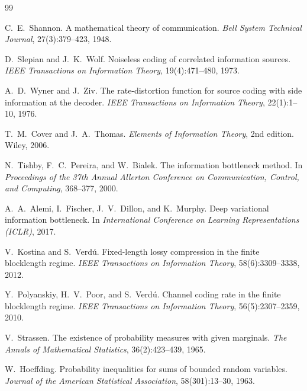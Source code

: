 \documentclass[11pt,a4paper]{article}
\theoremstyle{remark}
\begin{document}
\begin{thebibliography}{99}

C.~E.~Shannon.
\newblock A mathematical theory of communication.
\newblock \emph{Bell System Technical Journal}, 27(3):379--423, 1948.

D.~Slepian and J.~K.~Wolf.
\newblock Noiseless coding of correlated information sources.
\newblock \emph{IEEE Transactions on Information Theory}, 19(4):471--480, 1973.

A.~D.~Wyner and J.~Ziv.
\newblock The rate-distortion function for source coding with side information at the decoder.
\newblock \emph{IEEE Transactions on Information Theory}, 22(1):1--10, 1976.

T.~M.~Cover and J.~A.~Thomas.
\newblock \emph{Elements of Information Theory}, 2nd edition.
\newblock Wiley, 2006.

N.~Tishby, F.~C.~Pereira, and W.~Bialek.
\newblock The information bottleneck method.
\newblock In \emph{Proceedings of the 37th Annual Allerton Conference on Communication,
  Control, and Computing}, 368--377, 2000.

A.~A.~Alemi, I.~Fischer, J.~V.~Dillon, and K.~Murphy.
\newblock Deep variational information bottleneck.
\newblock In \emph{International Conference on Learning Representations (ICLR)}, 2017.

V.~Kostina and S.~Verd\'{u}.
\newblock Fixed-length lossy compression in the finite blocklength regime.
\newblock \emph{IEEE Transactions on Information Theory}, 58(6):3309--3338, 2012.

Y.~Polyanskiy, H.~V.~Poor, and S.~Verd\'{u}.
\newblock Channel coding rate in the finite blocklength regime.
\newblock \emph{IEEE Transactions on Information Theory}, 56(5):2307--2359, 2010.

V.~Strassen.
\newblock The existence of probability measures with given marginals.
\newblock \emph{The Annals of Mathematical Statistics}, 36(2):423--439, 1965.

W.~Hoeffding.
\newblock Probability inequalities for sums of bounded random variables.
\newblock \emph{Journal of the American Statistical Association},
  58(301):13--30, 1963.


\end{thebibliography}
\end{document}

